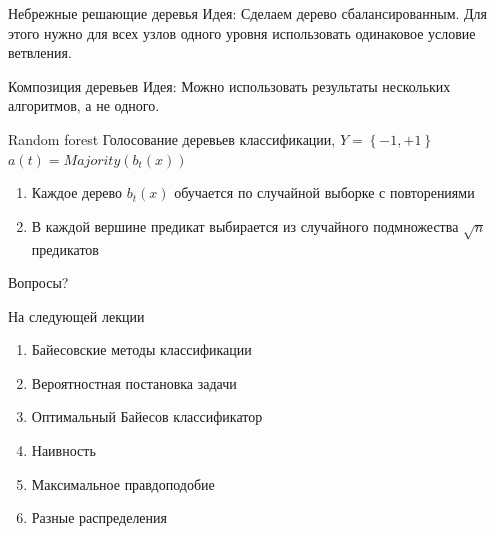 \documentclass[10pt]{beamer}
\begin{document}
{
\begin{frame}{Небрежные решающие деревья}
  \alert{Идея}: Сделаем дерево сбалансированным. Для этого нужно для всех узлов одного уровня использовать одинаковое условие ветвления.
\end{frame}
}

\begin{frame}{Композиция деревьев}
  \alert{Идея}: Можно использовать результаты нескольких	алгоритмов, а не одного.
\end{frame}

\begin{frame}{Random forest}
	Голосование деревьев классификации, $Y = \left\{ -1, +1 \right\}$\\
	$a(t) = Majority(b_t(x))$%
	\begin{enumerate}[--]
  	  \item Каждое дерево $b_t(x)$ обучается по случайной выборке с повторениями
	  \item В каждой вершине предикат выбирается из случайного подмножества $\sqrt{n}$ предикатов
	\end{enumerate}
\end{frame}

\begin{frame}[standout]
  Вопросы?
\end{frame}

\appendix

\begin{frame}{На следующей лекции}
  	\begin{enumerate} [--]
		\item Байесовские методы классификации
		\item Вероятностная постановка задачи
		\item Оптимальный Байесов классификатор
		\item Наивность
		\item Максимальное правдоподобие
		\item Разные распределения
	\end{enumerate}
\end{frame}
\end{document}
